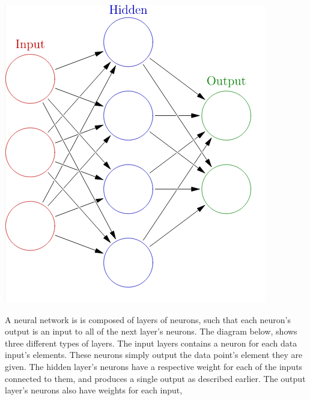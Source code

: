 \begin{center}
\includegraphics[scale = 0.35]{src/diagrams/neural_net_diagram.png}
\end{center}

A neural network is is composed of layers of neurons,
such that each neuron's output is an input to all of the next layer's neurons.
The diagram below, shows three different types of layers.
The input layers contains a neuron for each data input's elements.
These neurons simply output the data point's element they are given.
The hidden layer's neurons have a respective weight for each of the inputs connected to them,
and produces a single output as described earlier.
The output layer's neurons also have weights for each input,

